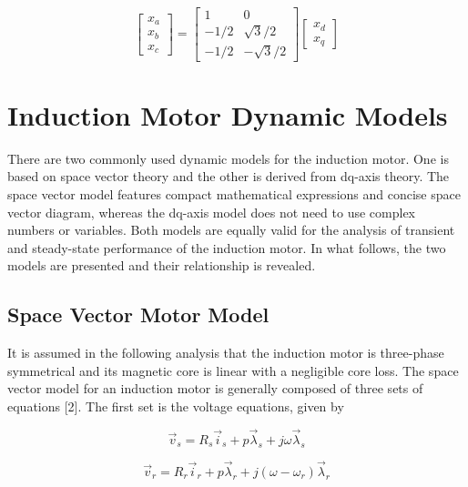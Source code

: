 \documentclass[letterpaper,12pt]{article}
\begin{document}
\begin{equation}
\begin{bmatrix}
x_a \\
x_b \\
x_c
\end{bmatrix}
=
\begin{bmatrix}
1 & 0 \\
-1/2 & \sqrt{3}/2 \\
-1/2 & -\sqrt{3}/2
\end{bmatrix}
\begin{bmatrix}
x_d \\
x_q
\end{bmatrix} \tag{14.2-8}
\end{equation}

\section{Induction Motor Dynamic Models}

There are two commonly used dynamic models for the induction motor. One is based on space vector theory and the other is derived from dq-axis theory. The space vector model features compact mathematical expressions and concise space vector diagram, whereas the dq-axis model does not need to use complex numbers or variables. Both models are equally valid for the analysis of transient and steady-state performance of the induction motor. In what follows, the two models are presented and their relationship is revealed.

\subsection{Space Vector Motor Model}

It is assumed in the following analysis that the induction motor is three-phase symmetrical and its magnetic core is linear with a negligible core loss. The space vector model for an induction motor is generally composed of three sets of equations [2]. The first set is the voltage equations, given by

\begin{equation}
\vec{v}_s = R_s \vec{i}_s + p \vec{\lambda}_s + j\omega \vec{\lambda}_s \tag{14.3-1}
\end{equation}

\begin{equation}
\vec{v}_r = R_r \vec{i}_r + p \vec{\lambda}_r + j(\omega - \omega_r)\vec{\lambda}_r \tag{14.3-1}
\end{equation}
\end{document}
